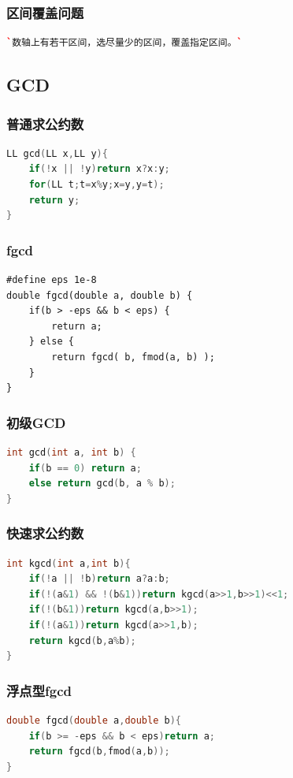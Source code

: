 \documentclass[a4paper]{article}
\begin{document}
\begin{CJK*}{UTF8}{gbsn}
\begin{multicols}{3}
\begin{flushleft}
\subsubsection{区间覆盖问题}
\begin{lstlisting}[language={c++}]
`数轴上有若干区间，选尽量少的区间，覆盖指定区间。`
\end{lstlisting}



\subsection{GCD}


\subsubsection{普通求公约数}
\begin{lstlisting}[language={c++}]
LL gcd(LL x,LL y){
	if(!x || !y)return x?x:y;
	for(LL t;t=x%y;x=y,y=t);
	return y;
}
\end{lstlisting}

\subsubsection{fgcd}
\begin{lstlisting}
#define eps 1e-8
double fgcd(double a, double b) {
	if(b > -eps && b < eps) {
		return a;
	} else {
		return fgcd( b, fmod(a, b) );
	}
}
\end{lstlisting}

\subsubsection{初级GCD}
\begin{lstlisting}[language={c++}]
int gcd(int a, int b) {
	if(b == 0) return a;
	else return gcd(b, a % b);
}
\end{lstlisting}

\subsubsection{快速求公约数}
\begin{lstlisting}[language={c++}]
int kgcd(int a,int b){
	if(!a || !b)return a?a:b;
	if(!(a&1) && !(b&1))return kgcd(a>>1,b>>1)<<1;
	if(!(b&1))return kgcd(a,b>>1);
	if(!(a&1))return kgcd(a>>1,b);
	return kgcd(b,a%b);
}
\end{lstlisting}

\subsubsection{浮点型fgcd}
\begin{lstlisting}[language={c++}]
double fgcd(double a,double b){
    if(b >= -eps && b < eps)return a;
    return fgcd(b,fmod(a,b));
}
\end{lstlisting}


\end{flushleft}
\end{multicols}
\end{CJK*}
\end{document}
